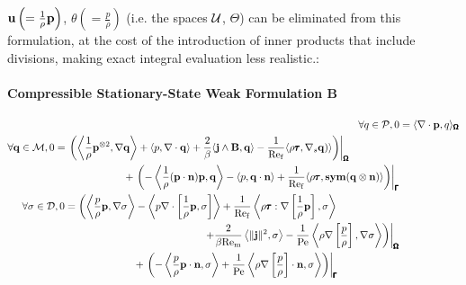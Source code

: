     \line

    $\mathbf{u}  \left(=  \frac{1}{\rho}\mathbf{p}\right)$, $\theta  \left(=  \frac{p}{\rho}\right)$ (i.e. the spaces $\mathcal{U}$, $\Theta$) can be eliminated from this formulation, at the cost of the introduction of inner products that include divisions, making exact integral evaluation less realistic.:

    \line
    
    \paragraph*{Compressible Stationary-State Weak Formulation B}
    \begin{align}
        \forall q \in \calP,  0  &=  \langle\nabla\cdot\bfp, q\rangle_{\bfOmega}  \\
        \begin{split}
            \forall \bfq \in \calM,  0  &=  \left.\left(\left\langle\frac{1}{\rho}\bfp^{\otimes 2}, \nabla\bfq\right\rangle + \langle p, \nabla\cdot\bfq\rangle + \frac{2}{\beta}\langle\bfj\wedge\bfB, \bfq\rangle - \frac{1}{\rmRef}\langle\rho\bftau, \nabla_{s}\bfq)\rangle\right)\right|_{\bfOmega}  \\
            &\;\;\;\;\;\;\;\;\;\;\;\;\;\;\;\;\;\;\;\;\;\;\;\;  + \left.\left(- \left\langle\frac{1}{\rho}(\bfp\cdot\bfn)\bfp, \bfq\right\rangle - \langle p, \bfq\cdot\bfn\rangle + \frac{1}{\rmRef}\langle\rho\bftau, \sym(\bfq\otimes\bfn)\rangle\right)\right|_{\bfGamma}
        \end{split}  \\
        \begin{split}
            \forall \sigma \in \calD,  0  &=  \left(\left\langle\frac{p}{\rho}\bfp, \nabla\sigma\right\rangle - \left\langle p\nabla\cdot\left[\frac{1}{\rho}{\bfp}, \sigma\right]\right\rangle + \frac{1}{\rmRef}\left\langle\rho\bftau:\nabla\left[\frac{1}{\rho}\bfp\right], \sigma\right\rangle\right.  \\
            &\;\;\;\;\;\;\;\;\;\;\;\;\;\;\;\;\;\;\;\;\;\;\;\;\;\;\;\;\;\;\;\;\;\;\;\;\;\;\;\;\;\;\;\;\;\;\;\;\left.\left.+ \frac{2}{\beta\rmRem}\left\langle\|\bfj\|^{2}, \sigma\right\rangle - \frac{1}{\rmPe}\left\langle\rho\nabla\left[\frac{p}{\rho}\right], \nabla\sigma\right\rangle\right)\right|_{\bfOmega}  \\
            &\;\;\;\;\;\;\;\;\;\;\;\;\;\;\;\;\;\;\;\;\;\;\;\;  + \left.\left(- \left\langle\frac{p}{\rho}\bfp\cdot\bfn, \sigma\right\rangle + \frac{1}{\rmPe}\left\langle\rho\nabla\left[\frac{p}{\rho}\right]\cdot\bfn, \sigma\right\rangle\right)\right|_{\bfGamma}

\end{split}
\end{align}
